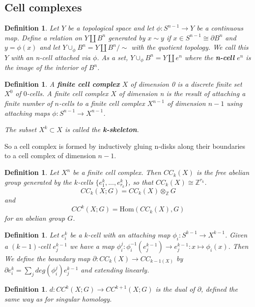 \documentclass{article}
\newtheorem{definition}[theorem]{Definition}
\begin{document}
\subsection{Cell complexes}
\begin{definition}
Let $Y$ be a topological space and let $\phi\colon S^{n-1}\to Y$ be a continuous map. Define a relation on $Y\coprod B^n$ generated by $x\sim y$ if $x\in S^{n-1}\cong\partial B^n$ and $y=\phi(x)$ and let $Y\cup_\phi B^n=Y\coprod B^n/\sim$ with the quotient topology. We call this $Y$ with an n-cell attached via $\phi$.
\noindent As a set, $Y\cup_\phi B^n=Y\coprod e^n$ where the \textbf{n-cell} $e^n$ is the image of the interior of $B^n$.
\end{definition}

\begin{definition}
A \textbf{finite cell complex} $X$ of dimension 0 is a discrete finite set $X^0$ of $0$-cells. A finite cell complex $X$ of dimension n is the result of attaching a finite number of $n$-cells to a finite cell complex $X^{n-1}$ of dimension $n-1$ using attaching maps $\phi\colon S^{n-1}\to X^{n-1}$.

\noindent The subset $X^k\subset X$ is called the \textbf{k-skeleton}.
\end{definition}

\noindent So a cell complex is formed by inductively gluing n-disks along their boundaries to a cell complex of dimension $n-1$.

\begin{definition}
Let $X^n$ be a finite cell complex. Then $CC_k(X)$ is the free abelian group generated by the $k$-cells $\{e^k_1,...,e^k_{r_k}\}$, so that $CC_k(X)\cong\mathbb{Z}^{r_k}$. \[CC_k(X;G)=CC_k(X)\otimes_\mathbb{Z}G\] and \[CC^k(X;G)=\text{Hom}(CC_k(X),G)\]for an abelian group $G$.
\end{definition}

\begin{definition}
Let $e_i^k$ be a $k$-cell with an attaching map $\phi_i\colon S^{k-1}\to X^{k-1}$. Given a $(k-1)$-cell $e_j^{k-1}$ we have a map $\phi_i^j:\phi_i^{-1}(e_j^{k-1})\to e_j^{k-1}:x\mapsto\phi_i(x)$. Then We define the boundary map $\partial\colon CC_k(X)\to CC_{k-1(X)}$ by $\partial e_i^k=\sum_jdeg(\phi_i^j)e_j^{k-1}$ and extending linearly.
\end{definition}

\begin{definition}
$d\colon CC^k(X;G)\to CC^{k+1}(X;G)$ is the dual of $\partial$, defined the same way as for singular homology.
\end{definition}
\end{document}
